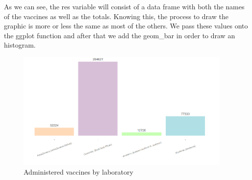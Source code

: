 As we can see, the res variable will consist of a data frame with both the names of the vaccines as well as the totals. Knowing this, the process to draw the graphic is more or less the same as most of the others. We pass these values onto the ggplot function and after that we add the geom\_bar in order to draw an histogram. 

\begin{figure}[H]
\centering
\includegraphics[width=300pt,trim=10 0 0 -10mm]{images/grafico4novo.png}
\caption{Administered vaccines by laboratory}
\label{fig:diagrama}
\end{figure}